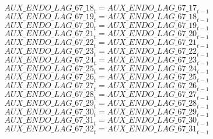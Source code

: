 \begin{dmath}
{AUX\_ENDO\_LAG\_67\_18}_{t}={AUX\_ENDO\_LAG\_67\_17}_{t-1}
\end{dmath}
\begin{dmath}
{AUX\_ENDO\_LAG\_67\_19}_{t}={AUX\_ENDO\_LAG\_67\_18}_{t-1}
\end{dmath}
\begin{dmath}
{AUX\_ENDO\_LAG\_67\_20}_{t}={AUX\_ENDO\_LAG\_67\_19}_{t-1}
\end{dmath}
\begin{dmath}
{AUX\_ENDO\_LAG\_67\_21}_{t}={AUX\_ENDO\_LAG\_67\_20}_{t-1}
\end{dmath}
\begin{dmath}
{AUX\_ENDO\_LAG\_67\_22}_{t}={AUX\_ENDO\_LAG\_67\_21}_{t-1}
\end{dmath}
\begin{dmath}
{AUX\_ENDO\_LAG\_67\_23}_{t}={AUX\_ENDO\_LAG\_67\_22}_{t-1}
\end{dmath}
\begin{dmath}
{AUX\_ENDO\_LAG\_67\_24}_{t}={AUX\_ENDO\_LAG\_67\_23}_{t-1}
\end{dmath}
\begin{dmath}
{AUX\_ENDO\_LAG\_67\_25}_{t}={AUX\_ENDO\_LAG\_67\_24}_{t-1}
\end{dmath}
\begin{dmath}
{AUX\_ENDO\_LAG\_67\_26}_{t}={AUX\_ENDO\_LAG\_67\_25}_{t-1}
\end{dmath}
\begin{dmath}
{AUX\_ENDO\_LAG\_67\_27}_{t}={AUX\_ENDO\_LAG\_67\_26}_{t-1}
\end{dmath}
\begin{dmath}
{AUX\_ENDO\_LAG\_67\_28}_{t}={AUX\_ENDO\_LAG\_67\_27}_{t-1}
\end{dmath}
\begin{dmath}
{AUX\_ENDO\_LAG\_67\_29}_{t}={AUX\_ENDO\_LAG\_67\_28}_{t-1}
\end{dmath}
\begin{dmath}
{AUX\_ENDO\_LAG\_67\_30}_{t}={AUX\_ENDO\_LAG\_67\_29}_{t-1}
\end{dmath}
\begin{dmath}
{AUX\_ENDO\_LAG\_67\_31}_{t}={AUX\_ENDO\_LAG\_67\_30}_{t-1}
\end{dmath}
\begin{dmath}
{AUX\_ENDO\_LAG\_67\_32}_{t}={AUX\_ENDO\_LAG\_67\_31}_{t-1}
\end{dmath}
